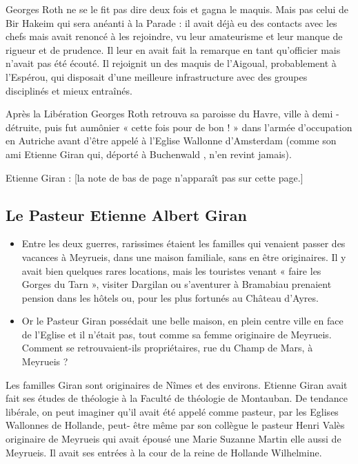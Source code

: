 Georges Roth ne se le fit pas dire deux fois et gagna le maquis. Mais pas celui de Bir Hakeim
qui sera anéanti à la Parade : il avait déjà eu des contacts avec les chefs mais avait renoncé à
les rejoindre, vu leur amateurisme et leur manque de rigueur et de prudence. Il leur en avait
fait la remarque en tant qu’officier mais n’avait pas été écouté.
Il rejoignit un des maquis de l’Aigoual, probablement à l’Espérou, qui disposait d’une
meilleure infrastructure avec des groupes disciplinés et mieux entraînés.

Après la Libération Georges Roth retrouva sa paroisse du Havre, ville à demi - détruite, puis
fut aumônier « cette fois pour de bon ! » dans l’armée d’occupation en Autriche avant d’être
appelé à l’Eglise Wallonne d’Amsterdam (comme son ami Etienne Giran qui, déporté à
Buchenwald , n’en revint jamais).

\bigskip

\noindent * Etienne Giran : [la note de bas de page n’apparaît pas sur cette page.]

\subsection{Le Pasteur Etienne Albert Giran}


\begin{itemize}
\item Entre les deux guerres, rarissimes étaient les familles qui venaient passer des vacances
à Meyrueis, dans une maison familiale, sans en être originaires. Il y avait bien
quelques rares locations, mais les touristes venant « faire les Gorges du Tarn », visiter
Dargilan ou s’aventurer à Bramabiau prenaient pension dans les hôtels ou, pour les
plus fortunés au Château d’Ayres.

\item Or le Pasteur Giran possédait une belle maison, en plein centre ville en face de
l’Eglise et il n’était pas, tout comme sa femme originaire de Meyrueis. Comment se
retrouvaient-ils propriétaires, rue du Champ de Mars, à Meyrueis ?
\end{itemize}

Les familles Giran sont originaires de Nîmes et des environs. Etienne Giran avait fait ses
études de théologie à la Faculté de théologie de Montauban. De tendance libérale, on peut
imaginer qu’il avait été appelé comme pasteur, par les Eglises Wallonnes de Hollande, peut-
être même par son collègue le pasteur Henri Valès originaire de Meyrueis qui avait épousé
une Marie Suzanne Martin elle aussi de Meyrueis. Il avait ses entrées à la cour de la reine de
Hollande Wilhelmine.

